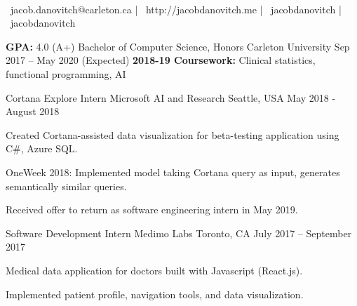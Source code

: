 \documentclass[]{awesome-cv}
\begin{document}
    
\begin{center}
	 \\
	\vspace{2mm}
	{\faEnvelope\ jacob.danovitch@carleton.ca} | {\faLink\ http://jacobdanovitch.me} | {\faGithub\ jacobdanovitch} | {\faLinkedin\ jacobdanovitch}
\end{center}
\vspace{1mm}
\begin{cventries}
	\cventry
    {\textbf{GPA:} 4.0 (A+)}
	{Bachelor of Computer Science, Honors}
	{Carleton University}
	{Sep 2017 – May 2020 (Expected)}
    {\textbf{2018-19 Coursework:} Clinical statistics, functional programming, AI}
\end{cventries}

\vspace{-2mm}
\begin{cventries}
    \vspace{-1mm}
    \cventry
	{Cortana Explore Intern}
	{Microsoft AI and Research}
	{Seattle, USA}
	{May 2018 - August 2018}
	{\begin{cvitems}
		\item {Created Cortana-assisted data visualization for beta-testing application using C\#, Azure SQL. }
	    \item {OneWeek 2018: Implemented model taking Cortana query as input, generates semantically similar queries.}
        \item {Received offer to return as software engineering intern in May 2019.}
		\end{cvitems}}
        
    \vspace{-4.5mm}
    \cventry
	{Software Development Intern}
	{Medimo Labs}
	{Toronto, CA}
	{July 2017 – September 2017}
	{\begin{cvitems}
		\item {Medical data application for doctors built with Javascript (React.js).}
        \item {Implemented patient profile, navigation tools, and data visualization.}
		\end{cvitems}}
\end{cventries}
\end{document}
